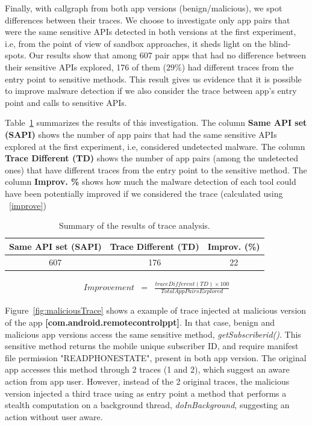 Finally, with callgraph from both app versions (benign/malicious), we spot differences between their traces. We choose to investigate only app pairs that were the same sensitive APIs detected in both versions at the first experiment, i.e, from the point of view of sandbox approaches, it sheds light on the blind-spots. Our results show that among $607$ pair apps that had no difference between their sensitive APIs explored, 176 of them ($29$\%) had different traces from the entry point to sensitive methods. This result gives us evidence that it is possible to improve malware detection if we also consider the trace between app's entry point and calls to sensitive APIs.

Table~\ref{tab:pa} summarizes the results of this investigation. The column \textbf{Same API set (SAPI)} shows the number of app pairs that had the same sensitive APIs explored at the first experiment, i.e, considered undetected malware. The column \textbf{Trace Different (TD)} shows the number of app pairs (among the undetected ones) that have different traces from the entry point to the sensitive method. The column \textbf{Improv. \%} shows how much the malware detection of each tool could have been potentially improved if we considered the trace (calculated using ~\eqref{improve})

\begin{table}[ht!]
  \caption{Summary of the results of trace analysis. }
  \centering
  \begin{small}
 \begin{tabular}{ccc}
   \toprule
   Same API set (SAPI) & Trace Different (TD) & Improv. (\%) \\   \midrule
   607 & 176 & 22 \\
 \bottomrule
 \end{tabular}
 \end{small}
 \label{tab:pa}
\end{table}



\begin{eqnarray}
Improvement & = & \frac{trace Different (TD) \times 100}{Total App Pairs Explored} 
\label{improve}
\end{eqnarray}


Figure~\ref{fig:maliciousTrace} shows a example of trace injected at malicious version of the app \textbf{[com.android.remotecontrolppt]}. In that case, benign and malicious app versions access the same sensitive method, \textit{getSubscriberid()}. This sensitive method returns the mobile unique subscriber ID, and require manifest file permission "READ\underline{\space}PHONE\underline{\space}STATE", present in both app version. The original app accesses this method through $2$ traces (1 and 2), which suggest an aware action from app user. However, instead of the 2 original traces, the malicious version injected a third trace using as entry point a method that performs a stealth computation on a background thread, \textit{doInBackground}, suggesting an action without user aware.


